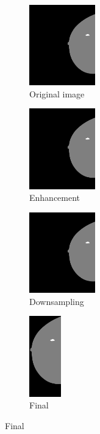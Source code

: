 \documentclass{beamer}
\begin{document}
\begin{frame}
\begin{figure}
\begin{subfigure}{0.24\textwidth}
				\centering
					\includegraphics[height = 3.5cm]{plots/label.png}
				\caption{Original image}
				\label{subfig:Preprocessinga}
			\end{subfigure}
			\begin{subfigure}{0.24\textwidth}
				\centering
					\includegraphics[height = 3.5cm]{plots/label_enhanced.png}
				\caption{Enhancement}
				\label{subfig:Preprocessingb}
			\end{subfigure}
			\begin{subfigure}{0.24\textwidth}
				\centering
					\includegraphics[height = 3.5cm]{plots/label_resized.png}
				\caption{Downsampling}
				\label{subfig:Preprocessingc}
			\end{subfigure}
			\begin{subfigure}{0.11\textwidth}
				\centering
					\includegraphics[height = 3.5cm]{plots/label_final.png}
				\caption{Final}
				\label{subfig:Preprocessingd}
			\end{subfigure}
		\end{figure}
	\end{frame}
	
\end{document}

